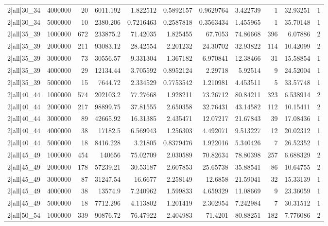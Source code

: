 \begin{tabular}{lrrrrrrrrrr}
2|all|30\_34 & 4000000 & 20 & 6011.192 & 1.822512 & 0.5892157 & 0.9629764 & 3.422739 & 1 & 32.93251 & 1 \\
2|all|30\_34 & 5000000 & 10 & 2380.206 & 0.7216463 & 0.2587818 & 0.3563434 & 1.455965 & 1 & 35.70148 & 1 \\
2|all|35\_39 & 1000000 & 672 & 233875.2 & 71.42035 & 1.825455 & 67.7053 & 74.86668 & 396 & 6.07886 & 2 \\
2|all|35\_39 & 2000000 & 211 & 93083.12 & 28.42554 & 2.201232 & 24.30702 & 32.93822 & 114 & 10.42099 & 2 \\
2|all|35\_39 & 3000000 & 73 & 30556.57 & 9.331304 & 1.367182 & 6.970841 & 12.38466 & 31 & 15.58854 & 1 \\
2|all|35\_39 & 4000000 & 29 & 12134.44 & 3.705592 & 0.8952124 & 2.29718 & 5.92514 & 9 & 24.52004 & 1 \\
2|all|35\_39 & 5000000 & 15 & 7644.72 & 2.334529 & 0.7753542 & 1.210981 & 4.453511 & 5 & 33.57748 & 1 \\
2|all|40\_44 & 1000000 & 574 & 202103.2 & 77.27668 & 1.928211 & 73.26712 & 80.84211 & 323 & 6.538914 & 2 \\
2|all|40\_44 & 2000000 & 217 & 98899.75 & 37.81555 & 2.650358 & 32.76431 & 43.14582 & 112 & 10.15411 & 2 \\
2|all|40\_44 & 3000000 & 89 & 42665.92 & 16.31385 & 2.435471 & 12.07217 & 21.67843 & 39 & 17.08436 & 1 \\
2|all|40\_44 & 4000000 & 38 & 17182.5 & 6.569943 & 1.256303 & 4.492071 & 9.513227 & 12 & 20.02312 & 1 \\
2|all|40\_44 & 5000000 & 18 & 8416.228 & 3.21805 & 0.8379476 & 1.922016 & 5.340426 & 7 & 26.52352 & 1 \\
2|all|45\_49 & 1000000 & 454 & 140656 & 75.02709 & 2.030589 & 70.82634 & 78.80398 & 257 & 6.688329 & 2 \\
2|all|45\_49 & 2000000 & 178 & 57239.21 & 30.53187 & 2.607853 & 25.65738 & 35.88541 & 86 & 10.64755 & 2 \\
2|all|45\_49 & 3000000 & 87 & 31247.54 & 16.6677 & 2.258149 & 12.6858 & 21.59041 & 32 & 15.33139 & 1 \\
2|all|45\_49 & 4000000 & 38 & 13574.9 & 7.240962 & 1.599833 & 4.659329 & 11.08669 & 9 & 23.36059 & 1 \\
2|all|45\_49 & 5000000 & 18 & 7712.296 & 4.113802 & 1.201419 & 2.302954 & 7.242984 & 7 & 30.31512 & 1 \\
2|all|50\_54 & 1000000 & 339 & 90876.72 & 76.47922 & 2.404983 & 71.4201 & 80.88251 & 182 & 7.776086 & 2 \\

\end{tabular}
